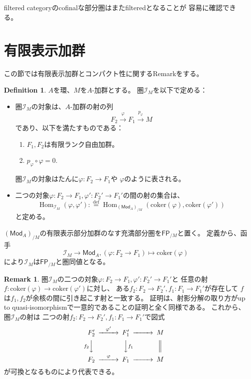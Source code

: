 \documentclass[uplatex]{jsarticle}
\theoremstyle{definition}
\newtheorem{defi}[defi]{Definition}
\newtheorem{rem}[rem]{Remark}
\theoremstyle{plain}
\DeclareMathOperator{\Hom}{\mathrm{Hom}}
\newcommand{\coker}{\mathrm{coker}}
\newcommand{\FP}[1]{\mathsf{FP}_{/#1}}
\newcommand{\dfn}{:\overset{\mathrm{def}}{=}}
\newcommand{\Mod}{\mathsf{Mod}}
\newcommand{\mcI}{\mathcal{I}}
\begin{document}
filtered categoryのcofinalな部分圏はまたfilteredとなることが
容易に確認できる。





\section{有限表示加群}
\label{fp-modules section}

この節では有限表示加群とコンパクト性に関するRemarkをする。

\begin{defi}
  \(A\)を環、\(M\)を\(A\)-加群とする。
  圏\(\mcI_M\)を以下で定める：
  \begin{itemize}
    \item
    圏\(\mcI_M\)の対象は、\(A\)-加群の射の列
    \[
    F_2\xrightarrow{\varphi} F_1\xrightarrow{p_{\varphi}} M
    \]
    であり、以下を満たすものである：
    \begin{enumerate}
      \item
      \(F_1,F_2\)は有限ランク自由加群。
      \item
      \(p_{\varphi}\circ \varphi = 0\).
    \end{enumerate}
    圏\(\mathcal{I}_M\)の対象はたんに\(\varphi:F_2\to F_1\)や
    \(\varphi\)のように表される。
    \item
    二つの対象\(\varphi:F_2\to F_1, \varphi':F_2'\to F_1'\)の間の射の集合は、
    \[
    \Hom_{\mcI_M}(\varphi,\varphi') \dfn
    \Hom_{(\Mod_A)_{/M}}(\coker(\varphi),\coker(\varphi'))
    \]
    と定める。
  \end{itemize}
  \((\Mod_A)_{/M}\)の有限表示部分加群のなす充満部分圏を\(\FP{M}\)と置く。
  定義から、函手
  \[
  \mcI_M \to \Mod_A , (\varphi:F_2\to F_1) \mapsto \coker(\varphi)
  \]
  により\(\mcI_M\)は\(\FP{M}\)と圏同値となる。
\end{defi}




\begin{rem}\label{rem: I_M rem}
  圏\(\mcI_M\)の二つの対象\(\varphi:F_2\to F_1,\varphi':F_2'\to F_1'\)と
  任意の射\(f:\coker(\varphi)\to \coker(\varphi')\)に対し、
  ある\(f_2:F_2\to F_2', f_1:F_1\to F_1'\)が存在して
  \(f\)は\(f_1,f_2\)が余核の間に引き起こす射と一致する。
  証明は、射影分解の取り方がup to quasi-isomorphismで一意的であることの証明と全く同様である。
  これから、圏\(\mcI_M\)の射は
  二つの射\(f_2:F_2\to F_2', f_1:F_1\to F_1'\)で図式
  \[
  \begin{CD}
    F_2' @>\varphi'>> F_1' @>>> M \\
    @Vf_2VV @VVf_1V @| \\
    F_2 @>\varphi>> F_1 @>>> M
  \end{CD}
  \]
  が可換となるものにより代表できる。
\end{rem}
\end{document}
